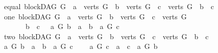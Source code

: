 \begin{isabellebody}
\ \ {\isacharbar}{\kern0pt}\ {\isacharparenleft}{\kern0pt}equal{\isacharparenright}{\kern0pt}\ {\isachardoublequoteopen}{\isacharparenleft}{\kern0pt}blockDAG\ G\ {\isasymand}\ a\ {\isasymin}\ verts\ G\ {\isasymand}\ b\ {\isasymin}\ verts\ G\ {\isasymand}\ c\ {\isasymin}\ verts\ G{\isacharparenright}{\kern0pt}\ {\isasymand}\ b\ {\isacharequal}{\kern0pt}\ c{\isachardoublequoteclose}\ \isanewline
\ \ {\isacharbar}{\kern0pt}\ {\isacharparenleft}{\kern0pt}one{\isacharparenright}{\kern0pt}\ {\isachardoublequoteopen}{\isacharparenleft}{\kern0pt}blockDAG\ G\ {\isasymand}\ a\ {\isasymin}\ verts\ G\ {\isasymand}\ b\ {\isasymin}\ verts\ G\ {\isasymand}\ c\ {\isasymin}\ verts\ G{\isacharparenright}{\kern0pt}\ {\isasymand}\isanewline
\ \ \ \ \ \ \ \ \ b\ {\isasymnoteq}\ c\ \ {\isasymand}\ {\isacharparenleft}{\kern0pt}{\isacharparenleft}{\kern0pt}{\isacharparenleft}{\kern0pt}a\ {\isasymrightarrow}\isactrlsup {\isacharplus}{\kern0pt}\isactrlbsub G\isactrlesub \ b{\isacharparenright}{\kern0pt}\ {\isasymor}\ a\ {\isacharequal}{\kern0pt}\ b{\isacharparenright}{\kern0pt}\ {\isasymand}\ {\isasymnot}{\isacharparenleft}{\kern0pt}a\ {\isasymrightarrow}\isactrlsup {\isacharplus}{\kern0pt}\isactrlbsub G\isactrlesub \ c{\isacharparenright}{\kern0pt}{\isacharparenright}{\kern0pt}{\isachardoublequoteclose}\ \isanewline
\ \ {\isacharbar}{\kern0pt}\ {\isacharparenleft}{\kern0pt}two{\isacharparenright}{\kern0pt}\ {\isachardoublequoteopen}{\isacharparenleft}{\kern0pt}blockDAG\ G\ {\isasymand}\ a\ {\isasymin}\ verts\ G\ {\isasymand}\ b\ {\isasymin}\ verts\ G\ {\isasymand}\ c\ {\isasymin}\ verts\ G{\isacharparenright}{\kern0pt}\ {\isasymand}\ b\ {\isasymnoteq}\ c\ \isanewline
\ \ {\isasymand}\ {\isasymnot}{\isacharparenleft}{\kern0pt}{\isacharparenleft}{\kern0pt}{\isacharparenleft}{\kern0pt}a\ {\isasymrightarrow}\isactrlsup {\isacharplus}{\kern0pt}\isactrlbsub G\isactrlesub \ b{\isacharparenright}{\kern0pt}\ {\isasymor}\ a\ {\isacharequal}{\kern0pt}\ b{\isacharparenright}{\kern0pt}\ {\isasymand}\ {\isasymnot}{\isacharparenleft}{\kern0pt}a\ {\isasymrightarrow}\isactrlsup {\isacharplus}{\kern0pt}\isactrlbsub G\isactrlesub \ c{\isacharparenright}{\kern0pt}{\isacharparenright}{\kern0pt}\ {\isasymand}\ \isanewline
\ \ {\isacharparenleft}{\kern0pt}{\isacharparenleft}{\kern0pt}a\ {\isasymrightarrow}\isactrlsup {\isacharplus}{\kern0pt}\isactrlbsub G\isactrlesub \ c{\isacharparenright}{\kern0pt}\ {\isasymor}\ a\ {\isacharequal}{\kern0pt}\ c{\isacharparenright}{\kern0pt}\ {\isasymand}\ {\isasymnot}{\isacharparenleft}{\kern0pt}a\ {\isasymrightarrow}\isactrlsup {\isacharplus}{\kern0pt}\isactrlbsub G\isactrlesub \ b{\isacharparenright}{\kern0pt}{\isachardoublequoteclose}\isanewline

\end{isabellebody}
